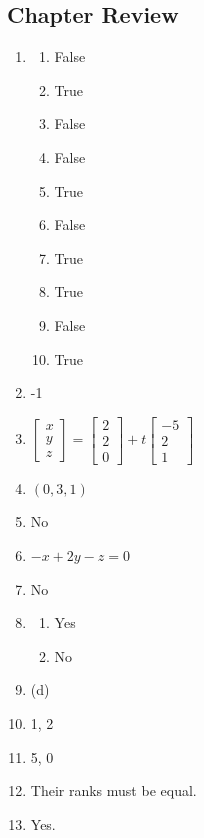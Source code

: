 \documentclass{article}
\newcommand{\colvecThree}[3]{
  \begin{bmatrix}
    #1 \\
    #2 \\
    #3
  \end{bmatrix}
}
\begin{document}
\subsection*{Chapter Review}
\begin{enumerate}
  \item
    \begin{enumerate}
      \item False
      \item True
      \item False
      \item False
      \item True
      \item False
      \item True
      \item True
      \item False
      \item True
    \end{enumerate}
    \setcounter{enumi}{6}
  \item -1
  \item $\colvecThree{x}{y}{z}=\colvecThree{2}{2}{0}+t\colvecThree{-5}{2}{1}$
  \item $(0, 3, 1)$
  \item No
  \item $-x+2y-z=0$
  \item No
  \item
    \begin{enumerate}
      \item Yes
      \item No
    \end{enumerate}
  \item (d)
  \item 1, 2
  \item 5, 0
    \setcounter{enumi}{18}
  \item Their ranks must be equal.
  \item Yes.
\end{enumerate}
\end{document}
